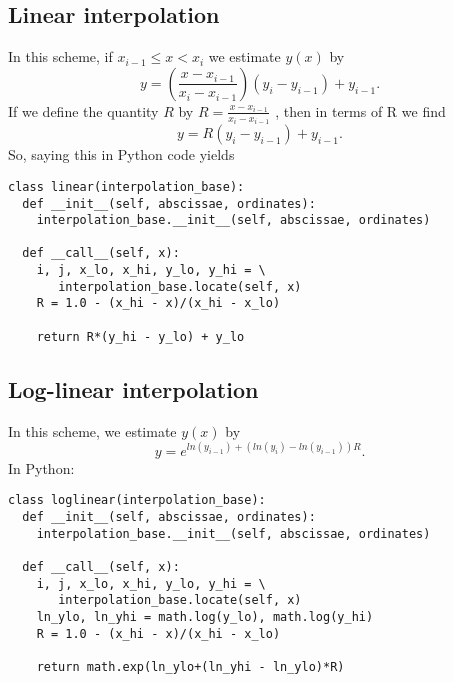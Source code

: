 \subsection{Linear interpolation}
In this scheme, if $x_{i-1} \leq x < x_{i}$ we estimate $y(x)$ by
\begin{equation}
  y = \left(\frac{x-x_{i-1}}{x_{i}-x_{i-1}}\right)(y_{i}-y_{i-1}) + y_{i-1}.
\end{equation}
If we define the quantity $R$ by $R = \frac{x-x_{i-1}}{x_{i}-x_{i-1}}$
, then in terms of R we find
\begin{equation}
 y = R\label{eq:linear-interpolation}\left(y_{i}-y_{i-1}\right) + y_{i-1}.
\end{equation}
So, saying this in Python code yields
\begin{verbatim}
class linear(interpolation_base):
  def __init__(self, abscissae, ordinates):
    interpolation_base.__init__(self, abscissae, ordinates)

  def __call__(self, x):
    i, j, x_lo, x_hi, y_lo, y_hi = \
       interpolation_base.locate(self, x)
    R = 1.0 - (x_hi - x)/(x_hi - x_lo)

    return R*(y_hi - y_lo) + y_lo

\end{verbatim}

\subsection{Log-linear interpolation}
In this scheme, we estimate $y(x)$ by
\begin{equation}
  y = e^{ln(y_{i-1})+\left(ln(y_{i})-ln(y_{i-1})\right)R}. \label{eq:log-linear-interpolation}
\end{equation}
In Python:
\begin{verbatim}
class loglinear(interpolation_base):
  def __init__(self, abscissae, ordinates):
    interpolation_base.__init__(self, abscissae, ordinates)

  def __call__(self, x):
    i, j, x_lo, x_hi, y_lo, y_hi = \
       interpolation_base.locate(self, x)
    ln_ylo, ln_yhi = math.log(y_lo), math.log(y_hi)
    R = 1.0 - (x_hi - x)/(x_hi - x_lo)

    return math.exp(ln_ylo+(ln_yhi - ln_ylo)*R)
\end{verbatim}

